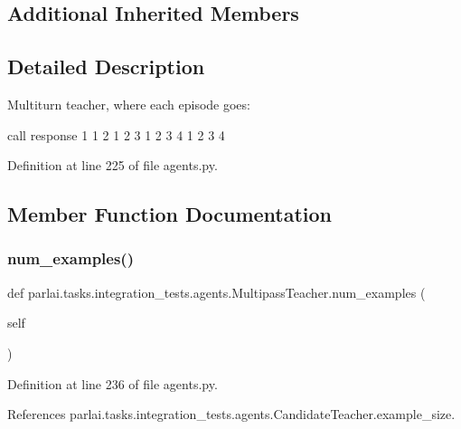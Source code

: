 \subsection*{Additional Inherited Members}


\subsection{Detailed Description}
\begin{DoxyVerb}Multiturn teacher, where each episode goes:

call      response
1         1
2         1 2
3         1 2 3
4         1 2 3 4
\end{DoxyVerb}
 

Definition at line 225 of file agents.\+py.



\subsection{Member Function Documentation}
\mbox{\label{classparlai_1_1tasks_1_1integration__tests_1_1agents_1_1MultipassTeacher_ae940c091daf534981c1cb5f42e38e8b2}} 
\subsubsection{\texorpdfstring{num\+\_\+examples()}{num\_examples()}}
{\footnotesize\ttfamily def parlai.\+tasks.\+integration\+\_\+tests.\+agents.\+Multipass\+Teacher.\+num\+\_\+examples (\begin{DoxyParamCaption}\item[{}]{self }\end{DoxyParamCaption})}



Definition at line 236 of file agents.\+py.



References parlai.\+tasks.\+integration\+\_\+tests.\+agents.\+Candidate\+Teacher.\+example\+\_\+size.

